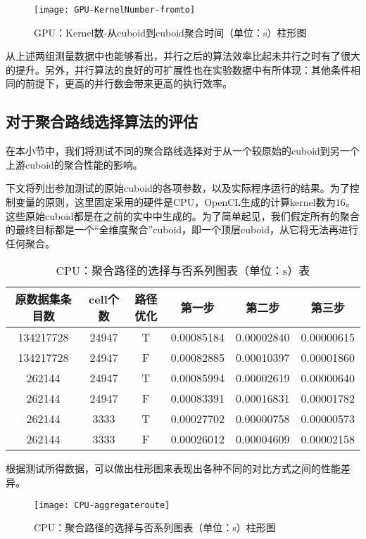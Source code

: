 \begin{figure}[ht]
\centering
\texttt{[image: GPU-KernelNumber-fromto]}
\caption{GPU：Kernel数-从cuboid到cuboid聚合时间（单位：s）柱形图} 
\label{fig:figure5}
\end{figure}

从上述两组测量数据中也能够看出，并行之后的算法效率比起未并行之时有了很大的提升。另外，并行算法的良好的可扩展性也在实验数据中有所体现：其他条件相同的前提下，更高的并行数会带来更高的执行效率。

\subsection{对于聚合路线选择算法的评估}

在本小节中，我们将测试不同的聚合路线选择对于从一个较原始的cuboid到另一个上游cuboid的聚合性能的影响。

下文将列出参加测试的原始cuboid的各项参数，以及实际程序运行的结果。为了控制变量的原则，这里固定采用的硬件是CPU，OpenCL生成的计算kernel数为$16$。这些原始cuboid都是在之前的实中中生成的。为了简单起见，我们假定所有的聚合的最终目标都是一个“全维度聚合”cuboid，即一个顶层cuboid，从它将无法再进行任何聚合。

\begin{table}[!htbp]
\centering
\caption{CPU：聚合路径的选择与否系列图表（单位：s）表} 
\label{tab:table10}
\begin{tabular}{|c|c|c|c|c|c|}
    \hline
    原数据集条目数 & cell个数 & 路径优化 & 第一步 & 第二步 & 第三步\\
    \hline
    134217728 & 24947 & T & 0.00085184 & 0.00002840 & 0.00000615\\
    \hline
    134217728 & 24947 & F & 0.00082885 & 0.00010397 & 0.00001860\\
    \hline
    262144 & 24947 & T & 0.00085994 & 0.00002619 & 0.00000640\\
    \hline
    262144 & 24947 & F & 0.00083391 & 0.00016831 & 0.00001782\\
    \hline
    262144 & 3333 & T & 0.00027702 & 0.00000758 & 0.00000573\\
    \hline
    262144 & 3333 & F & 0.00026012 & 0.00004609 & 0.00002158\\
    \hline
\end{tabular}
\end{table}

根据测试所得数据，可以做出柱形图来表现出各种不同的对比方式之间的性能差异。

\begin{figure}[ht]
\centering
\texttt{[image: CPU-aggregateroute]}
\caption{CPU：聚合路径的选择与否系列图表（单位：s）柱形图} 
\label{fig:figure6}
\end{figure}

